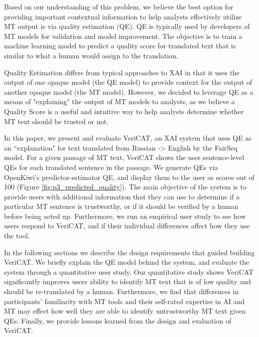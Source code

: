 Based on our understanding of this problem, we believe the best option for providing important contextual information to help analysts effectively utilize MT output is via quality estimation (QE). QE is typically used by developers of MT models for validation and model improvement. The objective is to train a machine learning model to predict a quality score for translated text that is similar to what a human would assign to the translation\cite{mauvcec2019machine}.  

Quality Estimation differs from typical approaches to XAI in that it uses the output of one opaque model (the QE model) to provide context for the output of another opaque model (the MT model). However, we decided to leverage QE as a means of "explaining" the output of MT models to analysts, as we believe a Quality Score is a useful and intuitive way to help analysts determine whether MT text should be trusted or not.    



In this paper, we present and evaluate VeriCAT, an XAI system that uses QE as an ``explanation" for text translated from Russian -> English by the FairSeq model. For a given passage of MT text, VeriCAT shows the user sentence-level QEs for each translated sentence in the passage. We generate QEs via OpenKiwi’s predictor-estimator QE, and display them to the user as scores out of 100 (Figure \ref{fig:p3_predicted_quality}). The main objective of the system is to provide users with additional information that they can use to determine if a particular MT sentence is trustworthy, or if it should be verified by a human before being acted up. Furthermore, we run an empirical user study to see how users respond to VeriCAT, and if their individual differences affect how they use the tool.  

In the following sections we describe the design requirements that guided building VeriCAT. We briefly explain the QE model behind the system, and evaluate the system through a quantitative user study. Our quantitative study shows VeriCAT significantly improves users ability to identify MT text that is of low quality and should be re-translated by a human. Furthermore, we find that differences in participants' familiarity with MT tools and their self-rated expertise in AI and MT may effect how well they are able to identify untrustworthy MT text given QEs. Finally, we provide lessons learned from the design and evaluation of VeriCAT. %

